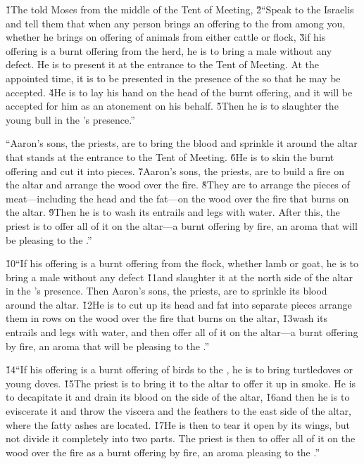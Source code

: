 


\v{1}The  told Moses from the middle of the Tent of Meeting, \v{2}``Speak to the Israelis and tell them that when any person brings an offering to the  from among you, whether he brings on offering of animals from either cattle or flock, \v{3}if his offering is a burnt offering from the herd, he is to bring a male without any defect. He is to present it at the entrance to the Tent of Meeting. At the appointed time, it is to be presented in the presence of the  so that he may be accepted. \v{4}He is to lay his hand on the head of the burnt offering, and it will be accepted for him as an atonement on his behalf. \v{5}Then he is to slaughter the young bull in the 's presence.''

``Aaron's sons, the priests, are to bring the blood and sprinkle it around the altar that stands at the entrance to the Tent of Meeting. \v{6}He is to skin the burnt offering and cut it into pieces. \v{7}Aaron's sons, the priests, are to build a fire on the altar and arrange the wood over the fire. \v{8}They are to arrange the pieces of meat---including the head and the fat---on the wood over the fire that burns on the altar. \v{9}Then he is to wash its entrails and legs with water. After this, the priest is to offer all of it on the altar---a burnt offering by fire, an aroma that will be pleasing to the .''

\v{10}``If his offering is a burnt offering from the flock, whether lamb or goat, he is to bring a male without any defect \v{11}and slaughter it at the north side of the altar in the 's presence. Then Aaron's sons, the priests, are to sprinkle its blood around the altar. \v{12}He is to cut up its head and fat into separate pieces arrange them in rows on the wood over the fire that burns on the altar, \v{13}wash its entrails and legs with water, and then offer all of it on the altar---a burnt offering by fire, an aroma that will be pleasing to the .''

\v{14}``If his offering is a burnt offering of birds to the , he is to bring turtledoves or young doves. \v{15}The priest is to bring it to the altar to offer it up in smoke. He is to decapitate it and drain its blood on the side of the altar, \v{16}and then he is to eviscerate it and throw the viscera and the feathers to the east side of the altar, where the fatty ashes are located. \v{17}He is then to tear it open by its wings, but not divide it completely into two parts. The priest is then to offer all of it on the wood over the fire as a burnt offering by fire, an aroma pleasing to the .''

